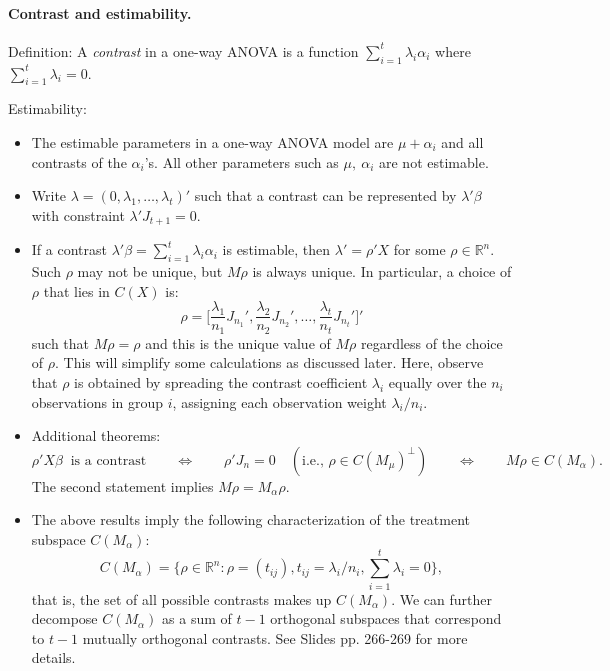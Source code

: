 \documentclass{article}
\theoremstyle{break}
\newcommand{\R}{\ensuremath{\mathbb{R}}}
\begin{document}
\paragraph{Contrast and estimability.}\hfill\break
Definition: A \emph{contrast} in a one-way ANOVA is a function $\sum_{i=1}^t \lambda_i \alpha_i$ where $\sum_{i=1}^t \lambda_i = 0$.

Estimability:
\begin{itemize}
    \item The estimable parameters in a one-way ANOVA model are $\mu + \alpha_i$ and all contrasts of the $\alpha_i$'s. All other parameters such as $\mu, \ \alpha_i$ are not estimable.
    \item Write $\lambda = (0, \lambda_1, \ldots, \lambda_t)'$ such that a contrast can be represented by $\lambda' \beta$ with constraint $\lambda' J_{t+1} = 0$. \item If a contrast $\lambda'\beta = \sum_{i=1}^t \lambda_i \alpha_i$ is estimable, then $\lambda' = \rho'X$ for some $\rho \in \R^n$. Such $\rho$ may not be unique, but $M\rho$ is always unique. In particular,  a choice of $\rho$ that lies in $C(X)$ is:
    \begin{equation}\label{eq:anova-special-rho}
        \rho = \big[ \frac{\lambda_1}{n_1}J_{n_1}', \frac{\lambda_2}{n_2}J_{n_2}', \ldots, \frac{\lambda_t}{n_t}J_{n_t}' \big]'
    \end{equation}
    such that $M\rho = \rho$ and this is the unique value of $M\rho$ regardless of the choice of $\rho$. This will simplify some calculations as discussed later.
    Here, observe that $\rho$ is obtained by spreading the contrast coefficient $\lambda_i$ equally over the $n_i$ observations in group $i$, assigning each observation weight $\lambda_i/n_i$.
    \item Additional theorems:
    \[
    \rho'X\beta\ \text{ is a contrast}
    \qquad\Longleftrightarrow\qquad
    \rho'J_n = 0 \quad (\text{i.e., } \rho \in C(M_\mu)^\perp)
    \qquad\Longleftrightarrow\qquad
    M\rho \in C(M_\alpha).
    \]
    The second statement implies $M\rho = M_\alpha \rho$. 
    \item The above results imply the following characterization of the treatment subspace $C(M_\alpha)$:
    \[
    C(M_\alpha) 
    = 
    \Big\{
        \rho \in \R^n: \rho = (t_{ij}), t_{ij} = \lambda_i / n_i, \sum_{i=1}^t \lambda_i = 0
    \Big\},
    \]
    that is, the set of all possible contrasts makes up $C(M_\alpha)$.
    We can further decompose $C(M_\alpha)$ as a sum of $t-1$ orthogonal subspaces that correspond to $t-1$ mutually orthogonal contrasts. See Slides pp. 266-269 for more details.
\end{itemize}
\end{document}
